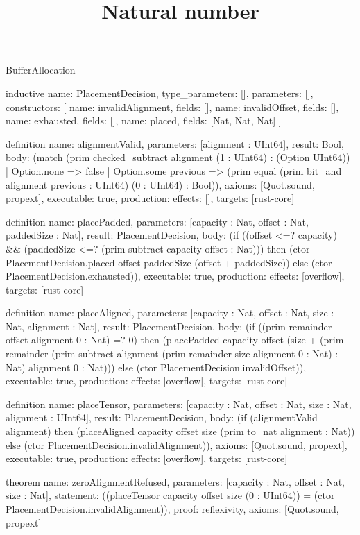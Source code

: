 \begin{lexlean}{BufferAllocation}
\title{Natural number}
\begin{semanticmodule}
inductive{
  name: PlacementDecision,
  type_parameters: [],
  parameters: [],
  constructors: [
    {name: invalidAlignment, fields: []},
    {name: invalidOffset, fields: []},
    {name: exhausted, fields: []},
    {name: placed, fields: [Nat, Nat, Nat]}
  ]
}

definition{
  name: alignmentValid,
  parameters: [alignment : UInt64],
  result: Bool,
  body: (match (prim checked_subtract alignment (1 : UInt64) : (Option UInt64))
    | Option.none => false
    | Option.some previous => (prim equal (prim bit_and alignment previous : UInt64) (0 : UInt64) : Bool)),
  axioms: [Quot.sound, propext],
  executable: true,
  production: {effects: [], targets: [rust-core]}
}

definition{
  name: placePadded,
  parameters: [capacity : Nat, offset : Nat, paddedSize : Nat],
  result: PlacementDecision,
  body: (if ((offset <=? capacity) && (paddedSize <=? (prim subtract capacity offset : Nat))) then (ctor PlacementDecision.placed offset paddedSize (offset + paddedSize)) else (ctor PlacementDecision.exhausted)),
  executable: true,
  production: {effects: [overflow], targets: [rust-core]}
}

definition{
  name: placeAligned,
  parameters: [capacity : Nat, offset : Nat, size : Nat, alignment : Nat],
  result: PlacementDecision,
  body: (if ((prim remainder offset alignment 0 : Nat) =? 0) then (placePadded capacity offset (size + (prim remainder (prim subtract alignment (prim remainder size alignment 0 : Nat) : Nat) alignment 0 : Nat))) else (ctor PlacementDecision.invalidOffset)),
  executable: true,
  production: {effects: [overflow], targets: [rust-core]}
}

definition{
  name: placeTensor,
  parameters: [capacity : Nat, offset : Nat, size : Nat, alignment : UInt64],
  result: PlacementDecision,
  body: (if (alignmentValid alignment) then (placeAligned capacity offset size (prim to_nat alignment : Nat)) else (ctor PlacementDecision.invalidAlignment)),
  axioms: [Quot.sound, propext],
  executable: true,
  production: {effects: [overflow], targets: [rust-core]}
}

theorem{
  name: zeroAlignmentRefused,
  parameters: [capacity : Nat, offset : Nat, size : Nat],
  statement: ((placeTensor capacity offset size (0 : UInt64)) = (ctor PlacementDecision.invalidAlignment)),
  proof: reflexivity{},
  axioms: [Quot.sound, propext]
}
\end{semanticmodule}
\end{lexlean}
